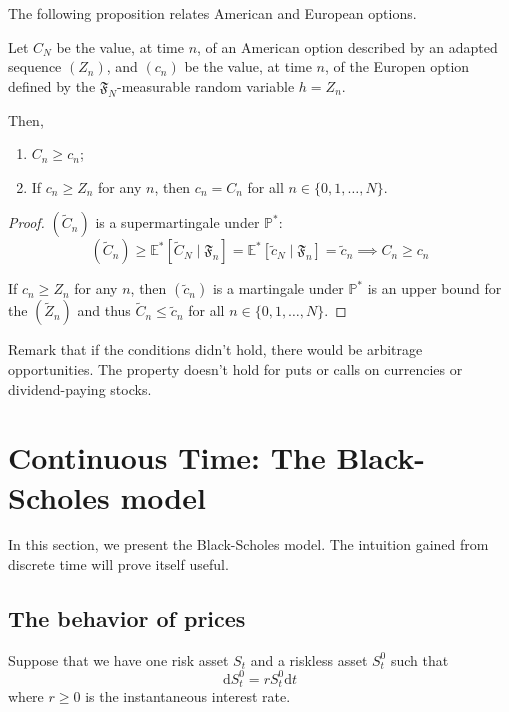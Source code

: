 The following proposition relates American and European options.

\begin{proposition}
    Let $C_N$ be the value, at time $n$, of an American option described by an adapted sequence $(Z_n)$, and $(c_n)$ be the value, at time $n$, of the Europen option defined by the $\mathfrak{F}_N$-measurable random variable $h = Z_n$. 

    Then,
    \begin{enumerate}
        \item $C_n \ge c_n$;
        \item If $c_n \ge Z_n$ for any $n$, then $c_n = C_n$ for all $n \in \{0, 1, \ldots, N\}$.
    \end{enumerate}
\end{proposition}

\begin{proof}
    $(\tilde{C}_n)$ is a supermartingale under $\mathbb{P}^\ast$:
    \[
        (\tilde{C}_n) \ge \mathbb{E}^\ast[\tilde{C}_N \mid \mathfrak{F}_n] = \mathbb{E}^\ast[\tilde{c}_N \mid \mathfrak{F}_n] = \tilde{c}_n \implies C_n \ge c_n
    \]

    If $c_n \ge Z_n$ for any $n$, then $(\tilde{c}_n)$ is a martingale under $\mathbb{P}^\ast$ is an upper bound for the $(\tilde{Z}_n)$ and thus $\tilde{C}_n \le \tilde{c}_n$ for all $n \in \{0, 1, \ldots, N\}$.
\end{proof}

Remark that if the conditions didn't hold, there would be arbitrage opportunities. The property doesn't hold for puts or calls on currencies or dividend-paying stocks.

\section{Continuous Time: The Black-Scholes model}

In this section, we present the Black-Scholes model. The intuition gained from discrete time will prove itself useful. 

\subsection{The behavior of prices}

Suppose that we have one risk asset $S_t$ and a riskless asset $S_t^0$ such that 
\[
    \mathrm{d}S_t^0 = rS_t^0 \mathrm{d}t
\]
where $r \ge 0$ is the instantaneous interest rate. 

